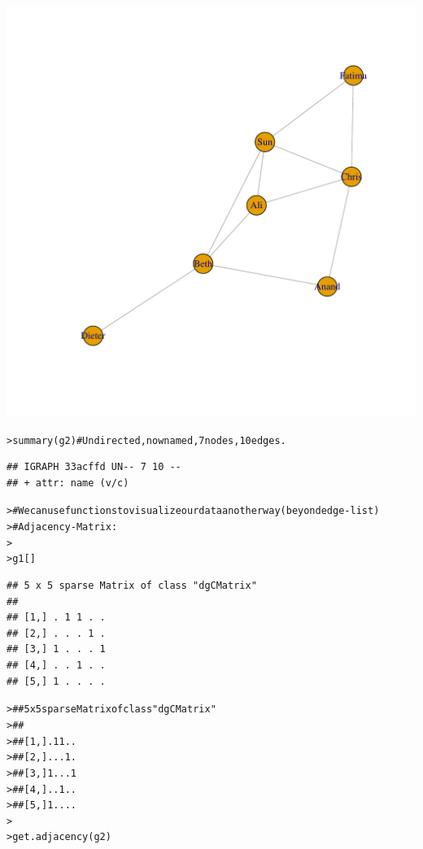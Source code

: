 \documentclass[12pt]{article}\usepackage[]{graphicx}\usepackage[]{color}
\makeatletter
\newcommand{\hlcom}[1]{\textcolor[rgb]{0.404,0.408,0.42}{#1}}%
\newcommand{\hlstd}[1]{\textcolor[rgb]{0.882,0.878,0.898}{#1}}%
\newcommand{\hlkwd}[1]{\textcolor[rgb]{0.733,0.388,0.812}{#1}}%
\newenvironment{kframe}{%
 \def\at@end@of@kframe{}%
 \ifinner\ifhmode%
  \def\at@end@of@kframe{\end{minipage}}%
  \begin{minipage}{\columnwidth}%
 \fi\fi%
 \def\FrameCommand##1{\hskip\@totalleftmargin \hskip-\fboxsep
 \colorbox{shadecolor}{##1}\hskip-\fboxsep
     \hskip-\linewidth \hskip-\@totalleftmargin \hskip\columnwidth}%
 \MakeFramed {\advance\hsize-\width
   \@totalleftmargin\z@ \linewidth\hsize
   \@setminipage}}%
 {\par\unskip\endMakeFramed%
 \at@end@of@kframe}
\newenvironment{knitrout}{}{} %
\makeatother
\begin{document}
\begin{flushleft}
\begin{center}
\begin{knitrout}
\includegraphics[width=6in]{figure/Network_Basics-2} 
\begin{kframe}\begin{alltt}
\hlstd{> }\hlkwd{summary}\hlstd{(g2)} \hlcom{# Undirected, now named, 7 nodes, 10 edges.}
\end{alltt}
\begin{verbatim}
## IGRAPH 33acffd UN-- 7 10 -- 
## + attr: name (v/c)
\end{verbatim}
\begin{alltt}
\hlstd{> }\hlcom{# We can use functions to visualize our data another way (beyond edge-list)}
\hlstd{> }\hlcom{# Adjacency-Matrix:}
\hlstd{> }
\hlstd{> }\hlstd{g1[]}
\end{alltt}
\begin{verbatim}
## 5 x 5 sparse Matrix of class "dgCMatrix"
##               
## [1,] . 1 1 . .
## [2,] . . . 1 .
## [3,] 1 . . . 1
## [4,] . . 1 . .
## [5,] 1 . . . .
\end{verbatim}
\begin{alltt}
\hlstd{> }\hlcom{## 5 x 5 sparse Matrix of class "dgCMatrix"}
\hlstd{> }\hlcom{##}
\hlstd{> }\hlcom{## [1,] . 1 1 . .}
\hlstd{> }\hlcom{## [2,] . . . 1 .}
\hlstd{> }\hlcom{## [3,] 1 . . . 1}
\hlstd{> }\hlcom{## [4,] . . 1 . .}
\hlstd{> }\hlcom{## [5,] 1 . . . .}
\hlstd{> }
\hlstd{> }\hlkwd{get.adjacency}\hlstd{(g2)}
\end{alltt}

\end{kframe}
\end{knitrout}
\end{center}
\end{flushleft}
\end{document}
